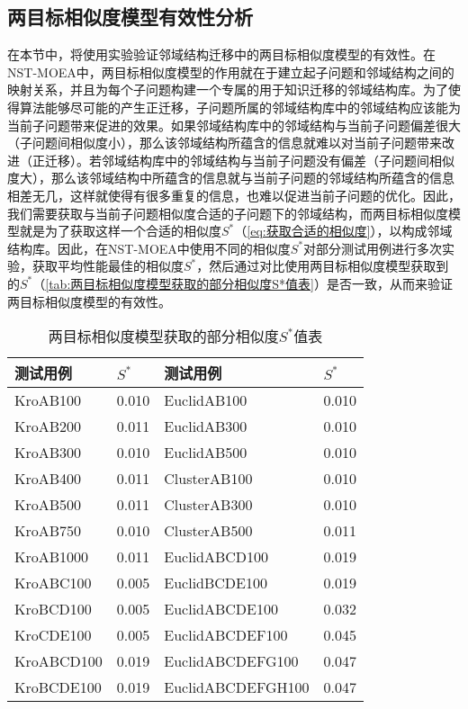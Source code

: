 \subsection{两目标相似度模型有效性分析}
\label{subsec:NST:实验与讨论:两目标相似度模型有效性分析}
在本节中，将使用实验验证邻域结构迁移中的两目标相似度模型的有效性。在NST-MOEA中，两目标相似度模型的作用就在于建立起子问题和邻域结构之间的映射关系，并且为每个子问题构建一个专属的用于知识迁移的邻域结构库。为了使得算法能够尽可能的产生正迁移，子问题所属的邻域结构库中的邻域结构应该能为当前子问题带来促进的效果。如果邻域结构库中的邻域结构与当前子问题偏差很大（子问题间相似度小），那么该邻域结构所蕴含的信息就难以对当前子问题带来改进（正迁移）。若邻域结构库中的邻域结构与当前子问题没有偏差（子问题间相似度大），那么该邻域结构中所蕴含的信息就与当前子问题的邻域结构所蕴含的信息相差无几，这样就使得有很多重复的信息，也难以促进当前子问题的优化。因此，我们需要获取与当前子问题相似度合适的子问题下的邻域结构，而两目标相似度模型就是为了获取这样一个合适的相似度$S^*$（\autoref{eq:获取合适的相似度}），以构成邻域结构库。因此，在NST-MOEA中使用不同的相似度$S^*$对部分测试用例进行多次实验，获取平均性能最佳的相似度$S^*$，然后通过对比使用两目标相似度模型获取到的$S^*$（\autoref{tab:两目标相似度模型获取的部分相似度S*值表}）是否一致，从而来验证两目标相似度模型的有效性。
\begin{table}[h]
    \centering
    \caption{两目标相似度模型获取的部分相似度$S^*$值表 \label{tab:两目标相似度模型获取的部分相似度S*值表}}
    \begin{tabular}{ll|ll}
        \toprule
        测试用例   & $S^*$  & 测试用例    & $S^*$ \\
        \midrule
        KroAB100          & 0.010    & EuclidAB100       & 0.010   \\
        KroAB200          & 0.011    & EuclidAB300       & 0.010   \\
        KroAB300          & 0.010    & EuclidAB500       & 0.010   \\
        KroAB400          & 0.011    & ClusterAB100      & 0.010   \\
        KroAB500          & 0.011    & ClusterAB300      & 0.010   \\
        KroAB750          & 0.010    & ClusterAB500      & 0.011   \\
        KroAB1000         & 0.011    & EuclidABCD100     & 0.019   \\
        KroABC100         & 0.005    & EuclidBCDE100     & 0.019   \\
        KroBCD100         & 0.005    & EuclidABCDE100    & 0.032   \\
        KroCDE100         & 0.005    & EuclidABCDEF100   & 0.045   \\
        KroABCD100        & 0.019    & EuclidABCDEFG100  & 0.047   \\
        KroBCDE100        & 0.019    & EuclidABCDEFGH100 & 0.047   \\
        \bottomrule
    \end{tabular}
\end{table}
